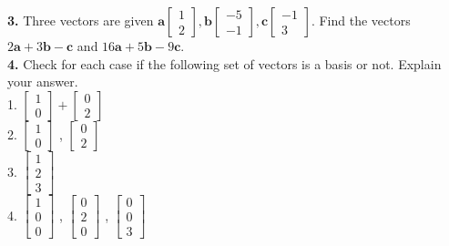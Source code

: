 \documentclass[a4paper,10pt]{article}
\begin{document}
\textbf{3.} Three vectors are given 
$\mathbf{a}
 \begin{bmatrix}
  1 \\
  2 
 \end{bmatrix}, 
 \mathbf{b}
 \begin{bmatrix}
  -5 \\
  -1 
 \end{bmatrix},
 \mathbf{c}
 \begin{bmatrix}
  -1 \\
  3 
 \end{bmatrix}$. 
Find the vectors $ 2 \mathbf{a} + 3\mathbf{b} - \mathbf{c} $ and 
$ 16 \mathbf{a} + 5\mathbf{b} - 9\mathbf{c} $. \\

\textbf{4.} Check for each case if the following set of vectors is a basis or not. Explain your answer. \\
1. $\begin{bmatrix}
  1 \\
  0 
 \end{bmatrix}
 + 
 \begin{bmatrix}
  0 \\
  2 
 \end{bmatrix}$ \\
2. $\begin{bmatrix}
  1 \\
  0 
 \end{bmatrix}$ ,
 $\begin{bmatrix}
  0 \\
  2 
 \end{bmatrix}$ \\
3. $\begin{bmatrix}
  1 \\
  2 \\
  3
 \end{bmatrix}$ \\
4.  $\begin{bmatrix}
  1 \\
  0 \\
  0
 \end{bmatrix}$ ,
  $\begin{bmatrix}
  0 \\
  2 \\
  0
 \end{bmatrix}$ ,
  $\begin{bmatrix}
  0 \\
  0 \\
  3
 \end{bmatrix}$ \\
\end{document}
